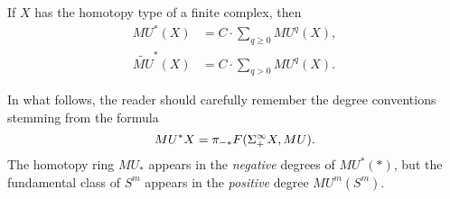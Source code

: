 \begin{theorem}\label{CGenerationForFiniteCplx}
If \(X\) has the homotopy type of a finite complex, then
\begin{align*}
MU^*(X) & = C \cdot \sum_{q \ge 0} MU^q(X), \\
\widetilde{MU}^*(X) & = C \cdot \sum_{q > 0} MU^q(X).
\end{align*}
\end{theorem}
\begin{remark}
In what follows, the reader should carefully remember the degree conventions stemming from the formula \[MU^* X = \pi_{-*} F(\Sigma^\infty_+ X, MU).\]  The homotopy ring \(MU_*\) appears in the \emph{negative} degrees of \(MU^*(*)\), but the fundamental class of \(S^{m}\) appears in the \emph{positive} degree \(MU^m(S^m)\).
\end{remark}
